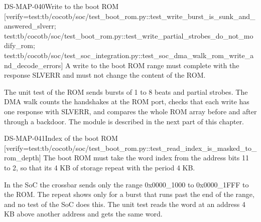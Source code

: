 \begin{requirement}{DS-MAP-040}{Write to the boot ROM}
[verify={test:tb/cocotb/soc/test_boot_rom.py::test_write_burst_is_sunk_and_answered_slverr; test:tb/cocotb/soc/test_boot_rom.py::test_write_partial_strobes_do_not_modify_rom; test:tb/cocotb/soc/test_soc_integration.py::test_soc_dma_walk_rom_write_and_decode_errors}]
A write to the boot ROM range must complete with the response SLVERR and must not change the content of the ROM.
\end{requirement}
\begin{information}
The unit test of the ROM sends bursts of 1 to 8 beats and partial strobes. The DMA walk counts the handshakes at the ROM port, checks that each write has one response with SLVERR, and compares the whole ROM array before and after through a backdoor. The module  is described in the next part of this chapter.
\end{information}

\begin{requirement}{DS-MAP-041}{Index of the boot ROM}
[verify={test:tb/cocotb/soc/test_boot_rom.py::test_read_index_is_masked_to_rom_depth}]
The boot ROM must take the word index from the address bits 11 to 2, so that its 4 KB of storage repeat with the period 4 KB.
\end{requirement}
\begin{information}
In the SoC the crossbar sends only the range 0x0000\_1000 to 0x0000\_1FFF to the ROM. The repeat shows only for a burst that runs past the end of the range, and no test of the SoC does this. The unit test reads the word at an address 4 KB above another address and gets the same word.
\end{information}

